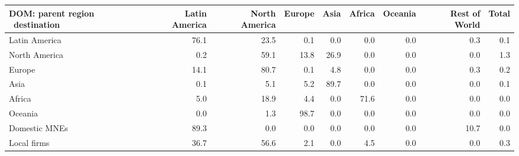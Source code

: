 \begin{tabular}{lrrrrrrrr}
\toprule
DOM: parent region \ destination & Latin America & North America & Europe & Asia & Africa & Oceania & Rest of World & Total \\
\midrule
Latin America & 76.1 & 23.5 & 0.1 & 0.0 & 0.0 & 0.0 & 0.3 & 0.1 \\
North America & 0.2 & 59.1 & 13.8 & 26.9 & 0.0 & 0.0 & 0.0 & 1.3 \\
Europe & 14.1 & 80.7 & 0.1 & 4.8 & 0.0 & 0.0 & 0.3 & 0.2 \\
Asia & 0.1 & 5.1 & 5.2 & 89.7 & 0.0 & 0.0 & 0.0 & 0.1 \\
Africa & 5.0 & 18.9 & 4.4 & 0.0 & 71.6 & 0.0 & 0.0 & 0.0 \\
Oceania & 0.0 & 1.3 & 98.7 & 0.0 & 0.0 & 0.0 & 0.0 & 0.0 \\
Domestic MNEs & 89.3 & 0.0 & 0.0 & 0.0 & 0.0 & 0.0 & 10.7 & 0.0 \\
Local firms & 36.7 & 56.6 & 2.1 & 0.0 & 4.5 & 0.0 & 0.0 & 0.3 \\
\bottomrule
\end{tabular}
